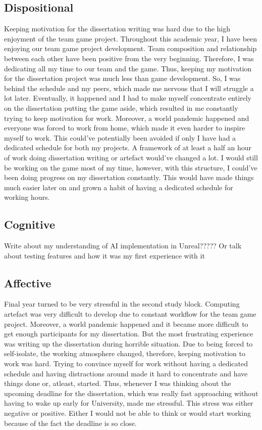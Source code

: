 \documentclass[journal]{IEEEtran}
\begin{document}
\subsection{Dispositional} %
Keeping motivation for the dissertation writing was hard due to the high enjoyment of the team game project. Throughout this academic year, I have been enjoying our team game project development. Team composition and relationship between each other have been positive from the very beginning. Therefore, I was dedicating all my time to our team and the game. Thus, keeping my motivation for the dissertation project was much less than game development. So, I was behind the schedule and my peers, which made me nervous that I will struggle a lot later. Eventually, it happened and I had to make myself concentrate entirely on the dissertation putting the game aside, which resulted in me constantly trying to keep motivation for work. Moreover, a world pandemic happened and everyone was forced to work from home, which made it even harder to inspire myself to work. This could've potentially been avoided if only I have had a dedicated schedule for both my projects. A framework of at least a half an hour of work doing dissertation writing or artefact would've changed a lot. I would still be working on the game most of my time, however, with this structure, I could've been doing progress on my dissertation constantly. This would have made things much easier later on and grown a habit of having a dedicated schedule for working hours.

\subsection{Cognitive}
Write about my understanding of AI implementation in Unreal?????
Or talk about testing features and how it was my first experience with it

\subsection{Affective} %
Final year turned to be very stressful in the second study block. Computing artefact was very difficult to develop due to constant workflow for the team game project. Moreover, a world pandemic happened and it became more difficult to get enough participants for my dissertation. But the most frustrating experience was writing up the dissertation during horrible situation. Due to being forced to self-isolate, the working atmosphere changed, therefore, keeping motivation to work was hard. Trying to convince myself for work without having a dedicated schedule and having distractions around made it hard to concentrate and have things done or, atleast, started. Thus, whenever I was thinking about the upcoming deadline for the dissertation, which was really fast approaching without having to wake up early for University, made me stressful. This stress was either negative or positive. Either I would not be able to think or would start working because of the fact the deadline is so close.
\end{document}
